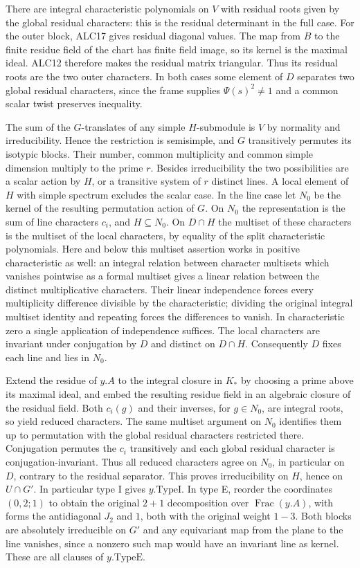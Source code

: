 There are integral characteristic polynomials on $V$ with residual
roots given by the global residual characters: this is the
residual determinant in the full case. For the outer block, ALC17
gives residual diagonal values. The map from $B$ to the finite
residue field of the chart has finite field image, so its kernel
is the maximal ideal. ALC12 therefore makes the residual matrix
triangular. Thus its residual roots are the two outer
characters. In both cases some element of $D$ separates two
global residual characters, since the frame supplies
$\Psi(s)^2\ne1$ and a common scalar twist preserves inequality.

The sum of the $G$-translates of any simple $H$-submodule is $V$
by normality and irreducibility. Hence the restriction is
semisimple, and $G$ transitively permutes its isotypic blocks.
Their number, common multiplicity and common simple dimension
multiply to the prime $r$. Besides irreducibility the two
possibilities are a scalar action by $H$, or a transitive system
of $r$ distinct lines. A local element of $H$ with simple
spectrum excludes the scalar case. In the line case let $N_0$
be the kernel of the resulting permutation action of $G$.
On $N_0$ the representation is the sum of line characters
$c_i$, and $H\subseteq N_0$. On $D\cap H$ the multiset of these
characters is the multiset of the local characters, by equality
of the split characteristic polynomials. Here and below this
multiset assertion works in positive characteristic as well:
an integral relation between character multisets which vanishes
pointwise as a formal multiset gives a linear relation between
the distinct multiplicative characters. Their linear independence
forces every multiplicity difference divisible by the characteristic;
dividing the original integral multiset identity and repeating
forces the differences to vanish. In characteristic zero a single
application of independence suffices.
The local characters are invariant under conjugation by $D$
and distinct on $D\cap H$. Consequently $D$ fixes each line
and lies in $N_0$.

Extend the residue of $y.A$ to the integral closure in $K_*$
by choosing a prime above its maximal ideal, and embed the
resulting residue field in an algebraic closure of the residual
field. Both $c_i(g)$ and their inverses, for $g\in N_0$, are
integral roots, so yield reduced characters. The same multiset
argument on $N_0$ identifies them up to permutation with the
global residual characters restricted there. Conjugation permutes
the $c_i$ transitively and each global residual character is
conjugation-invariant. Thus all reduced characters agree on
$N_0$, in particular on $D$, contrary to the residual separator.
This proves irreducibility on $H$, hence on $U\cap G'$.
In particular type I gives $y.\mathrm{TypeI}$. In type E, reorder
the coordinates $(0,2;1)$ to obtain the original $2+1$
decomposition over $\operatorname{Frac}(y.A)$, with forms the
antidiagonal $J_2$ and $1$, both with the original weight
$1-3$. Both blocks are absolutely irreducible on $G'$ and
any equivariant map from the plane to the line vanishes, since
a nonzero such map would have an invariant line as kernel.
These are all clauses of $y.\mathrm{TypeE}$.


